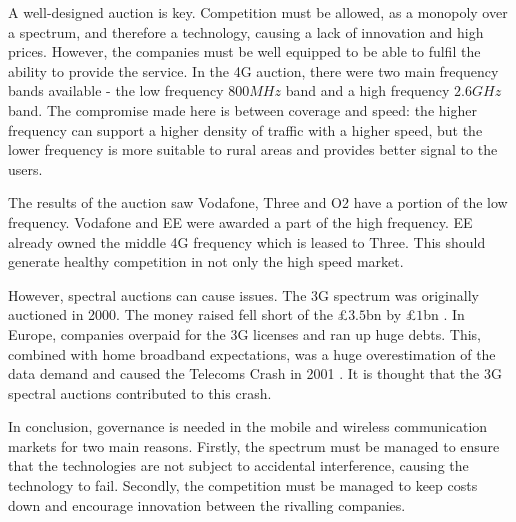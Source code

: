 A well-designed auction is key. 
Competition must be allowed, as a monopoly over a spectrum, and therefore a technology, causing a lack of innovation and high prices. 
However, the companies must be well equipped to be able to fulfil the ability to provide the service.
In the 4G auction, there were two main frequency bands available - the low frequency $800MHz$ band and a high frequency $2.6GHz$ band. 
The compromise made here is between coverage and speed: the higher frequency can support a higher density of traffic with a higher speed, but the lower frequency is more suitable to rural areas and provides better signal to the users.

The results of the auction saw Vodafone, Three and O2 have a portion of the low frequency. 
Vodafone and EE were awarded a part of the high frequency.
EE already owned the middle 4G frequency which is leased to Three. 
This should generate healthy competition in not only the high speed market. 

However, spectral auctions can cause issues.
The 3G spectrum was originally auctioned in 2000. 
The money raised fell short of the \pounds $3.5$bn by \pounds $1$bn \cite{telecom}.
In Europe, companies overpaid for the 3G licenses and ran up huge debts.
This, combined with home broadband expectations, was a huge overestimation of the data demand and caused the Telecoms Crash in 2001 \cite{telecom:crash}.
It is thought that the 3G spectral auctions contributed to this crash.

In conclusion, governance is needed in the mobile and wireless communication markets for two main reasons.
Firstly, the spectrum must be managed to ensure that the technologies are not subject to accidental interference, causing the technology to fail. 
Secondly, the competition must be managed to keep costs down and encourage innovation between the rivalling companies. 


